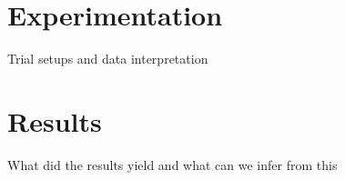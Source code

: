

\chapter{Experimentation}
Trial setups and data interpretation


\chapter{Results}
What did the results yield and what can we infer from this
